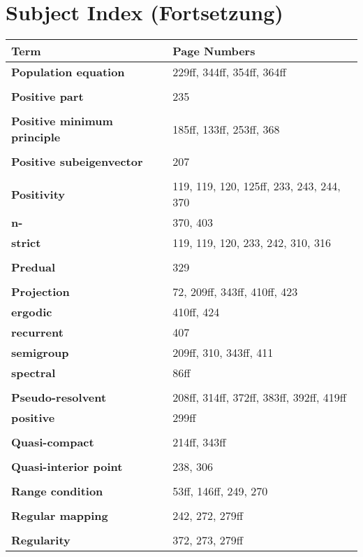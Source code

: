 \documentclass[10pt]{scrartcl}
\begin{document}
\section*{Subject Index (Fortsetzung)}

\begin{longtable}{>{\bfseries}p{6cm}p{8cm}}
\textbf{Term} & \textbf{Page Numbers} \\
\hline
\endhead

\textbf{Population equation} & 229ff, 344ff, 354ff, 364ff \\
\\
\textbf{Positive part} & 235 \\
\\
\textbf{Positive minimum principle} & 185ff, 133ff, 253ff, 368 \\
\\
\textbf{Positive subeigenvector} & 207 \\
\\
\textbf{Positivity} & 119, 119, 120, 125ff, 233, 243, 244, 370 \\
\quad n- & 370, 403 \\
\quad strict & 119, 119, 120, 233, 242, 310, 316 \\
\\
\textbf{Predual} & 329 \\
\\
\textbf{Projection} & 72, 209ff, 343ff, 410ff, 423 \\
\quad ergodic & 410ff, 424 \\
\quad recurrent & 407 \\
\quad semigroup & 209ff, 310, 343ff, 411 \\
\quad spectral & 86ff \\
\\
\textbf{Pseudo-resolvent} & 208ff, 314ff, 372ff, 383ff, 392ff, 419ff \\
\quad positive & 299ff \\
\\
\textbf{Quasi-compact} & 214ff, 343ff \\
\\
\textbf{Quasi-interior point} & 238, 306 \\
\\
\textbf{Range condition} & 53ff, 146ff, 249, 270 \\
\\
\textbf{Regular mapping} & 242, 272, 279ff \\
\\
\textbf{Regularity} & 372, 273, 279ff \\

\end{longtable}
\end{document}
